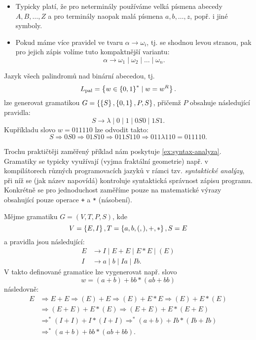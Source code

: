 \begin{remark}
    \begin{itemize}
        \item Typicky platí, že pro neterminály používáme velká písmena abecedy $A,B,\ldots,Z$ a pro terminály naopak malá písmena $a,b,\ldots,z$, popř. i jiné symboly.
        \item Pokud máme více pravidel ve tvaru $\alpha\to\omega_i$, tj. se shodnou levou stranou, pak pro jejich zápis volíme tuto kompaktnější variantu:
        \[\alpha\to\omega_1\mid\omega_2\mid\dots\mid\omega_n.\]
    \end{itemize}
\end{remark}
\begin{example}
    Jazyk všech palindromů nad binární abecedou, tj.
    \[L_\text{pal}=\left\{w\in\left\{0,1\right\}^*\mid w=w^R\right\}.\]
    lze generovat gramatikou $G=\left\{\left\{S\right\},\left\{0,1\right\},P,S\right\}$, přičemž $P$ obsahuje následující pravidla:
    \[S\to\lambda\mid 0\mid 1\mid 0S0\mid 1S1.\]
    Kupříkladu slovo $w=011110$ lze odvodit takto:
    \[S\Rightarrow 0S0\Rightarrow 01S10\Rightarrow011S110\Rightarrow011\lambda 110=011110.\]
\end{example}
Trochu praktičtěji zaměřený příklad nám poskytuje \ref{ex:syntax-analyza}. Gramatiky se typicky využívají (vyjma fraktální geometrie) např. v kompilátorech různých programovacích jazyků v rámci tzv. \emph{syntaktické analýzy}, při níž se (jak název napovídá) kontroluje syntaktická správnost zápisu programu. Konkrétně se pro jednoduchost zaměříme pouze na matematické výrazy obsahující pouze operace \texttt{+} a \texttt{*} (násobení).
\begin{example}\label{ex:syntax-analyza}
    Mějme gramatiku $G=(V,T,P,S)$, kde
    \[V=\left\{E,I\right\},T=\left\{a,b,(,),+,*\right\},S=E\]
    a pravidla jsou následující:
    \begin{align*}
        E&\to I\mid E+E\mid E*E\mid (E)\\
        I&\to a\mid b\mid Ia\mid Ib.
    \end{align*}
    V takto definované gramatice lze vygenerovat např. slovo
    \[w=(a+b)+bb*(ab+bb)\]
    následovně:
    \begin{align*}
        E&\Rightarrow E+E\Rightarrow(E)+E\Rightarrow(E)+E*E\Rightarrow(E)+E*(E)\\
        &\Rightarrow(E+E)+E*(E)\Rightarrow(E+E)+E*(E+E)\\
        &\Rightarrow^*(I+I)+I*(I+I)\Rightarrow^*(a+b)+Ib*(Ib+Ib)\\
        &\Rightarrow^*(a+b)+bb*(ab+bb).
    \end{align*}
\end{example}
